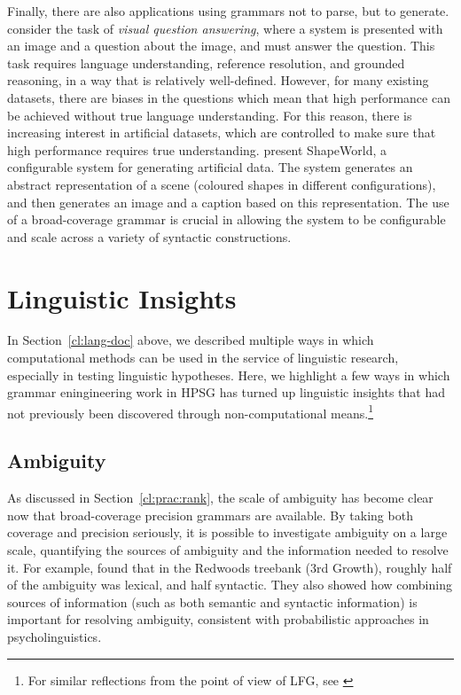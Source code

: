 \documentclass[output=paper,nonflat]{langsci/langscibook}
\begin{document}
Finally, there are also applications using grammars not to parse, but to generate.
\citet{kuhnle2018shapeworld} consider the task of \textit{visual question answering},
where a system is presented with an image and a question about the image,
and must answer the question.
This task requires language understanding, reference resolution, and grounded reasoning,
in a way that is relatively well-defined.
However, for many existing datasets, there are biases in the questions
which mean that high performance can be achieved without true language understanding.
For this reason, there is increasing interest in artificial datasets,
which are controlled to make sure that high performance requires true understanding.
\citeauthor{kuhnle2018shapeworld} present ShapeWorld,
a configurable system for generating artificial data.
The system generates an abstract representation of a scene
(coloured shapes in different configurations),
and then generates an image and a caption based on this representation.
The use of a broad-coverage grammar is crucial
in allowing the system to be configurable
and scale across a variety of syntactic constructions.



\section{Linguistic Insights}
\label{cl:insight}

In Section~\ref{cl:lang-doc} above, we described multiple ways in which computational methods can be used in the service of linguistic research, especially in testing linguistic hypotheses. Here, we highlight a few ways in which grammar eningineering work in HPSG has turned up linguistic insights that had not previously been discovered through non-computational means.\footnote{For similar reflections from the point of view of LFG, see \citealt{King:16}}

\subsection{Ambiguity} %

As discussed in Section~\ref{cl:prac:rank},
the scale of ambiguity has become clear now that broad-coverage precision grammars are available.
By taking both coverage and precision seriously,
it is possible to investigate ambiguity on a large scale,
quantifying the sources of ambiguity and the information needed to resolve it.
For example, \citet{Tou:Man:Shi:Fli:Oep:02,Tou:Man:Fli:Oep:05}
found that in the Redwoods treebank (3rd Growth),
roughly half of the ambiguity was lexical, and half syntactic.
They also showed how combining sources of information
(such as both semantic and syntactic information)
is important for resolving ambiguity,
consistent with probabilistic approaches in psycholinguistics.
\end{document}
